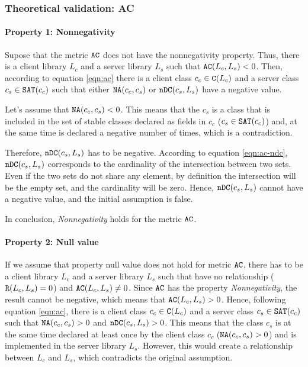 \subsubsection{Theoretical validation: AC}

\paragraph{Property 1: Nonnegativity}
Supose that the metric $\verb|AC|$ does not have the nonnegativity property. Thus, there is a client library $L_c$ and a server library $L_s$ such that $\verb|AC|(L_c, L_s) < 0$. Then, according to equation \ref{eqn:ac} there is a client class $c_c \in \verb|C|(L_c)$ and a server class $c_s \in \verb|SAT|(c_c)$ such that either $\verb|NA|(c_c, c_s)$ or $\verb|nDC|(c_s, L_s)$ have a negative value.

Let's assume that $\verb|NA|(c_c, c_s) < 0$. This means that the $c_s$ is a class that is included in the set of stable classes declared as fields in $c_c$ ($c_s \in \verb|SAT|(c_c)$) and, at the same time is declared a negative number of times, which is a contradiction.

Therefore, $\verb|nDC|(c_s, L_s)$ has to be negative. According to equation \ref{eqn:ac-ndc}, $\verb|nDC|(c_s, L_s)$ corresponds to the cardinality of the intersection between two sets. Even if the two sets do not share any element, by definition the intersection will be the empty set, and the cardinality will be zero. Hence, $\verb|nDC|(c_s, L_s)$ cannot have a negative value, and the initial assumption is false.

In conclusion, \textit{Nonnegativity} holds for the metric $\verb|AC|$.

\paragraph{Property 2: Null value}
If we assume that property null value does not hold for metric $\verb|AC|$, there has to be a client library $L_c$ and a server library $L_s$ such that have no relationship ($\verb|R|(L_c, L_s) = 0$) and $\verb|AC|(L_c, L_s)	\neq 0$. Since $\verb|AC|$ has the property \textit{Nonnegativity}, the result cannot be negative, which means that $\verb|AC|(L_c, L_s) > 0$. Hence, following equation \ref{eqn:ac}, there is a client class $c_c \in \verb|C|(L_c)$ and a server class $c_s \in \verb|SAT|(c_c)$ such that $\verb|NA|(c_c, c_s) > 0$ and $\verb|nDC|(c_s, L_s) > 0$. This means that the class $c_s$ is at the same time declared at least once by the client class $c_c$ ($\verb|NA|(c_c, c_s) > 0$) and is implemented in the server library $L_s$. However, this would create a relationship between $L_c$ and $L_s$, which contradicts the original assumption.

